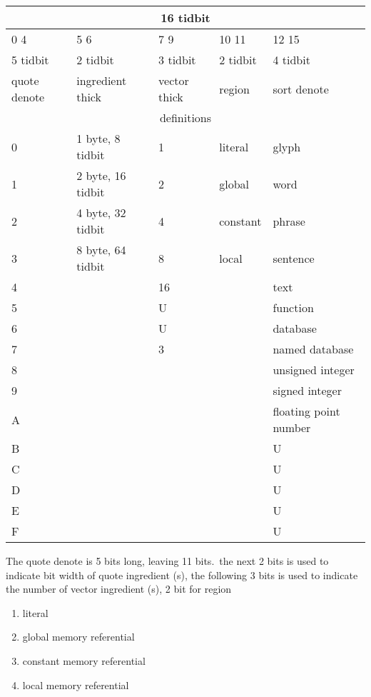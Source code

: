 \documentclass[12pt]{report}
\begin{document}
\begin{tabular}{*{5}{l}}
\toprule
\multicolumn{5}{|c|}{16 tidbit} \\
\midrule
0 \hfill 4 & 5 \hfill 6            & 7 \hfill 9      & 10 \hfill 11  & 12 \hfill
15 \\
\midrule
5 tidbit     & 2 tidbit            & 3 tidbit        & 2 tidbit & 4 tidbit \\
\midrule
quote denote & ingredient thick & vector thick & region & sort denote \\
\midrule
\midrule
\multicolumn{5}{|c|}{definitions}\\
\bottomrule
0            & 1 byte, 8 tidbit   & 1               & literal & glyph \\
1            & 2 byte, 16 tidbit  & 2               & global  & word \\
2            & 4 byte, 32 tidbit  & 4               & constant & phrase \\
3            & 8 byte, 64 tidbit  & 8               & local   & sentence \\
4            &                    & 16              & & text \\
5            &                    & U               & & function \\
6            &                    & U               & & database \\
7            &                    & 3               & & named database \\
8 & & & & unsigned integer \\
9 & & & & signed integer \\
A & & & & floating point number \\
B & & & & U \\
C & & & & U \\
D & & & & U \\
E & & & & U \\
F & & & & U \\
\bottomrule
\end{tabular}
The quote denote is 5 bits long, leaving 11 bits.\
the next 2 bits is used to indicate bit width of quote ingredient (s),
the following 3 bits is used to indicate the number of vector ingredient (s),
2 bit for region
\begin{enumerate}
  \setcounter{enumi}{0}
  \item literal
  \item global memory referential
  \item constant memory referential
  \item local memory referential
\end{enumerate}
\end{document}
